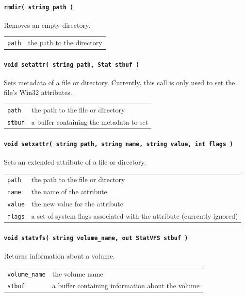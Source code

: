\paragraph{\texttt{rmdir( string path )}}
Removes an empty directory.

\begin{tabularx}{\textwidth}{lX}
 \texttt{path} & the path to the directory\\
\end{tabularx}

\paragraph{\texttt{void setattr( string path, Stat stbuf )}}
Sets metadata of a file or directory. Currently, this call is only used to set the file's Win32 attributes.

\begin{tabularx}{\textwidth}{lX}
 \texttt{path} & the path to the file or directory\\
 \texttt{stbuf} & a buffer containing the metadata to set\\
\end{tabularx}

\paragraph{\texttt{void setxattr( string path, string name, string value, int flags~)}}
Sets an extended attribute of a file or directory.

\begin{tabularx}{\textwidth}{lX}
 \texttt{path} & the path to the file or directory\\
 \texttt{name} & the name of the attribute\\
 \texttt{value} & the new value for the attribute\\
 \texttt{flags} & a set of system flags associated with the attribute (currently ignored)\\
\end{tabularx}

\paragraph{\texttt{void statvfs( string volume\_name, out StatVFS stbuf~)}}
Returns information about a volume.

\begin{tabularx}{\textwidth}{lX}
 \texttt{volume\_name} & the volume name\\
 \texttt{stbuf} & a buffer containing information about the volume\\
\end{tabularx}

